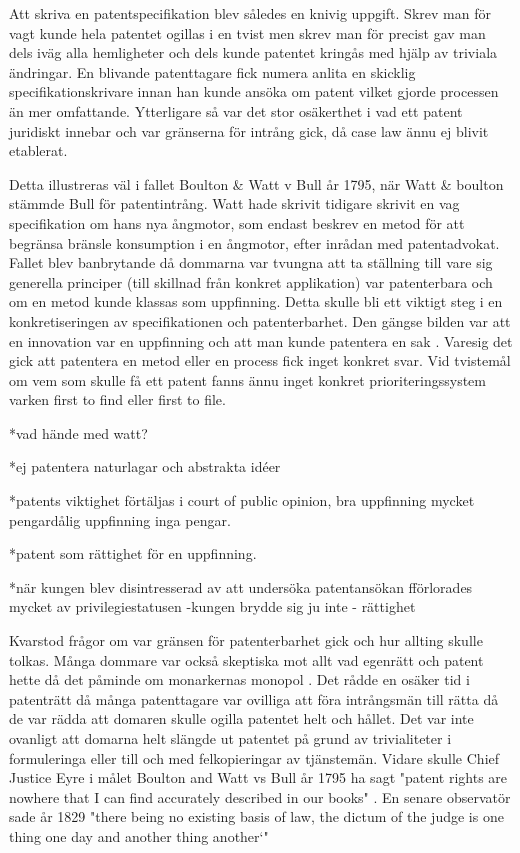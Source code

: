 Att skriva en patentspecifikation blev således en knivig uppgift. Skrev man för vagt kunde hela patentet
ogillas i en tvist men skrev man för precist gav man dels iväg alla hemligheter och dels kunde patentet
kringås med hjälp av triviala ändringar\cite{macleod}. En
blivande patenttagare fick numera anlita en skicklig specifikationskrivare innan han kunde ansöka om
patent vilket gjorde processen än mer omfattande\cite{macleod}. Ytterligare så var det stor osäkerthet i vad ett patent juridiskt innebar och var gränserna för intrång gick, då case law ännu ej blivit etablerat.

Detta illustreras väl i fallet Boulton \& Watt v Bull år 1795, när Watt \& boulton stämmde Bull för patentintrång. Watt hade skrivit tidigare skrivit en vag specifikation om hans nya ångmotor, som endast beskrev en metod för att begränsa bränsle konsumption i en ångmotor, efter inrådan med patentadvokat\cite{bracha}. Fallet blev banbrytande då dommarna var tvungna att ta ställning till vare sig generella principer (till skillnad från konkret applikation) var patenterbara och om en metod kunde klassas som uppfinning\cite{bracha}. Detta skulle bli ett viktigt steg i en konkretiseringen av specifikationen och patenterbarhet. Den gängse bilden var att en innovation var en uppfinning och att man kunde patentera en sak \cite{bracha}. Varesig det gick att patentera en metod eller en process fick inget konkret svar. Vid tvistemål om vem som skulle få ett patent fanns ännu inget konkret prioriteringssystem varken first to find eller first to file\cite{bracha}.

*vad hände med watt?

*ej patentera naturlagar och abstrakta idéer 

*patents viktighet förtäljas i court of public opinion, bra uppfinning mycket pengardålig uppfinning inga pengar.

*patent som rättighet för en uppfinning.

*när kungen blev disintresserad av att undersöka patentansökan fförlorades mycket av privilegiestatusen -kungen brydde sig ju inte - rättighet


Kvarstod frågor om var gränsen för patenterbarhet gick och hur allting skulle tolkas\cite{bracha}. Många dommare var också skeptiska mot allt vad egenrätt och patent hette då det påminde om monarkernas monopol \cite{macleod}.
Det rådde en osäker tid i patenträtt då många patenttagare var ovilliga att föra intrångsmän till
rätta då de var rädda att domaren skulle ogilla patentet helt och hållet. Det var inte ovanligt att
domarna helt slängde ut patentet på grund av trivialiteter i formuleringa eller till och med
felkopieringar av tjänstemän\cite{macleod}. Vidare skulle Chief Justice Eyre i målet Boulton and Watt vs Bull år 1795 ha sagt "patent rights are nowhere that I can find accurately described in our books" \cite{macleod}. En senare observatör sade år 1829 "there being no existing basis of law, the dictum of the judge is 
one thing one day and another thing another‘" \cite{macleod}


